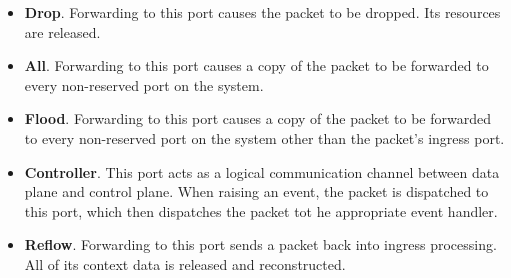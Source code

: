 \begin{itemize}
\item \textbf{Drop}. Forwarding to this port causes the packet to be dropped. Its resources are released.

\item \textbf{All}. Forwarding to this port causes a copy of the packet to be forwarded to every non-reserved port on the system.

\item \textbf{Flood}. Forwarding to this port causes a copy of the packet to be forwarded to every non-reserved port on the system other than the packet's ingress port.

\item \textbf{Controller}. This port acts as a logical communication channel between data plane and control plane. When raising an event, the packet is dispatched to this port, which then dispatches the packet tot he appropriate event handler.

\item \textbf{Reflow}. Forwarding to this port sends a packet back into ingress processing. All of its context data is released and reconstructed.
\end{itemize} 

%
